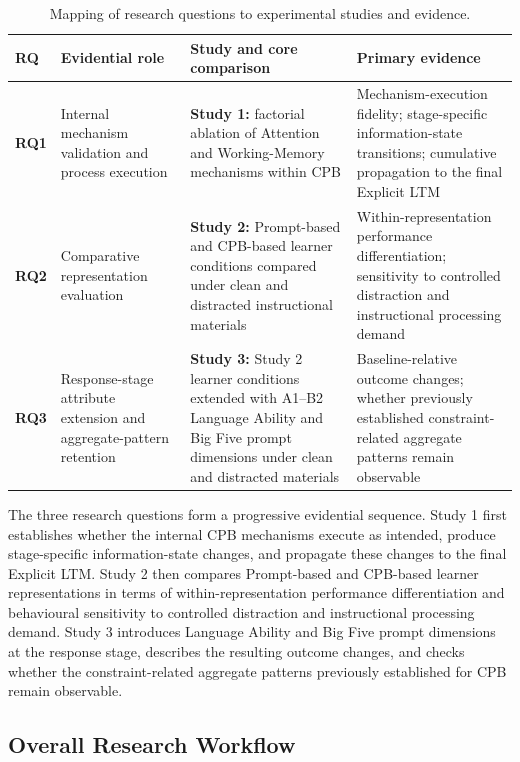 \begin{table}[H]
\centering
\caption{Mapping of research questions to experimental studies and evidence.}
\label{tab:rq-study-mapping}
\small
\setlength{\tabcolsep}{3pt}
\renewcommand{\arraystretch}{1.2}
\begin{tabular}{p{} p{} p{} p{}}
\toprule
\textbf{RQ} & \textbf{Evidential role} & \textbf{Study and core comparison} & \textbf{Primary evidence} \\
\midrule
\textbf{RQ1} & Internal mechanism validation and process execution & \textbf{Study 1:} factorial ablation of Attention and Working-Memory mechanisms within CPB & Mechanism-execution fidelity; stage-specific information-state transitions; cumulative propagation to the final Explicit LTM \\
\textbf{RQ2} & Comparative representation evaluation & \textbf{Study 2:} Prompt-based and CPB-based learner conditions compared under clean and distracted instructional materials & Within-representation performance differentiation; sensitivity to controlled distraction and instructional processing demand \\
\textbf{RQ3} & Response-stage attribute extension and aggregate-pattern retention & \textbf{Study 3:} Study 2 learner conditions extended with A1--B2 Language Ability and Big Five prompt dimensions under clean and distracted materials & Baseline-relative outcome changes; whether previously established constraint-related aggregate patterns remain observable \\
\bottomrule
\end{tabular}
\end{table}

The three research questions form a progressive evidential sequence. Study 1 first establishes whether the internal CPB mechanisms execute as intended, produce stage-specific information-state changes, and propagate these changes to the final Explicit LTM. Study 2 then compares Prompt-based and CPB-based learner representations in terms of within-representation performance differentiation and behavioural sensitivity to controlled distraction and instructional processing demand. Study 3 introduces Language Ability and Big Five prompt dimensions at the response stage, describes the resulting outcome changes, and checks whether the constraint-related aggregate patterns previously established for CPB remain observable.

\subsection{Overall Research Workflow}
\label{subsec:overall-research-workflow}

